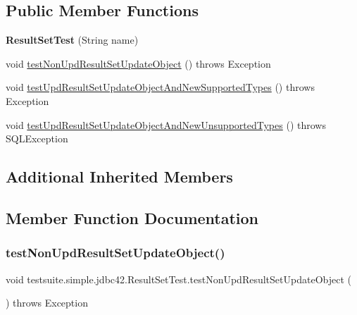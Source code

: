 \subsection*{Public Member Functions}
\begin{DoxyCompactItemize}
\item 
\mbox{\label{classtestsuite_1_1simple_1_1jdbc42_1_1_result_set_test_a1d32c16fe3688e32fac94674ee0f3c09}} 
{\bfseries Result\+Set\+Test} (String name)
\item 
void \mbox{\hyperlink{classtestsuite_1_1simple_1_1jdbc42_1_1_result_set_test_aa48b090a8d145a3f5d28ed32e83155ad}{test\+Non\+Upd\+Result\+Set\+Update\+Object}} ()  throws Exception 
\item 
void \mbox{\hyperlink{classtestsuite_1_1simple_1_1jdbc42_1_1_result_set_test_a5fff236a5ef9f804466336afed0eff09}{test\+Upd\+Result\+Set\+Update\+Object\+And\+New\+Supported\+Types}} ()  throws Exception 
\item 
void \mbox{\hyperlink{classtestsuite_1_1simple_1_1jdbc42_1_1_result_set_test_a21136fdda4bac0ce2b9d330ec20a1519}{test\+Upd\+Result\+Set\+Update\+Object\+And\+New\+Unsupported\+Types}} ()  throws S\+Q\+L\+Exception 
\end{DoxyCompactItemize}
\subsection*{Additional Inherited Members}


\subsection{Member Function Documentation}
\mbox{\label{classtestsuite_1_1simple_1_1jdbc42_1_1_result_set_test_aa48b090a8d145a3f5d28ed32e83155ad}} 
\subsubsection{\texorpdfstring{test\+Non\+Upd\+Result\+Set\+Update\+Object()}{testNonUpdResultSetUpdateObject()}}
{\footnotesize\ttfamily void testsuite.\+simple.\+jdbc42.\+Result\+Set\+Test.\+test\+Non\+Upd\+Result\+Set\+Update\+Object (\begin{DoxyParamCaption}{ }\end{DoxyParamCaption}) throws Exception}

